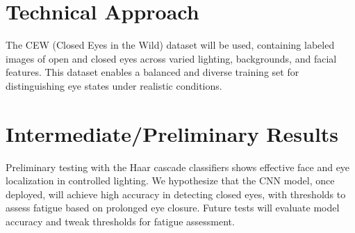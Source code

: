 \documentclass[10pt,twocolumn,letterpaper]{article}
\begin{document}
\section{Technical Approach}

The CEW (Closed Eyes in the Wild) dataset will be used, containing labeled images of open and closed eyes across varied lighting, backgrounds, and facial features. This dataset enables a balanced and diverse training set for distinguishing eye states under realistic conditions.


\section{Intermediate/Preliminary Results}

Preliminary testing with the Haar cascade classifiers shows effective face and eye localization in controlled lighting. We hypothesize that the CNN model, once deployed, will achieve high accuracy in detecting closed eyes, with thresholds to assess fatigue based on prolonged eye closure. Future tests will evaluate model accuracy and tweak thresholds for fatigue assessment. 


{\small


}
\end{document}

